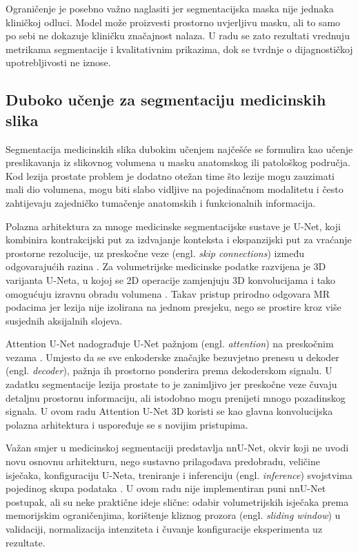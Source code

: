 \documentclass[a4paper,12pt,oneside]{article}
\begin{document}
Ograničenje je posebno važno naglasiti jer segmentacijska maska nije jednaka kliničkoj odluci. Model može proizvesti prostorno uvjerljivu masku, ali to samo po sebi ne dokazuje kliničku značajnost nalaza. U radu se zato rezultati vrednuju metrikama segmentacije i kvalitativnim prikazima, dok se tvrdnje o dijagnostičkoj upotrebljivosti ne iznose.

\subsection{Duboko učenje za segmentaciju medicinskih slika}

Segmentacija medicinskih slika dubokim učenjem najčešće se formulira kao učenje preslikavanja iz slikovnog volumena u masku anatomskog ili patološkog područja. Kod lezija prostate problem je dodatno otežan time što lezije mogu zauzimati mali dio volumena, mogu biti slabo vidljive na pojedinačnom modalitetu i često zahtijevaju zajedničko tumačenje anatomskih i funkcionalnih informacija.

Polazna arhitektura za mnoge medicinske segmentacijske sustave je U-Net, koji kombinira kontrakcijski put za izdvajanje konteksta i ekspanzijski put za vraćanje prostorne rezolucije, uz preskočne veze (engl. \textit{skip connections}) između odgovarajućih razina \cite{unet}. Za volumetrijske medicinske podatke razvijena je 3D varijanta U-Neta, u kojoj se 2D operacije zamjenjuju 3D konvolucijama i tako omogućuju izravnu obradu volumena \cite{unet3d}. Takav pristup prirodno odgovara MR podacima jer lezija nije izolirana na jednom presjeku, nego se prostire kroz više susjednih aksijalnih slojeva.

Attention U-Net nadograđuje U-Net pažnjom (engl. \textit{attention}) na preskočnim vezama \cite{attention_unet}. Umjesto da se sve enkoderske značajke bezuvjetno prenesu u dekoder (engl. \textit{decoder}), pažnja ih prostorno ponderira prema dekoderskom signalu. U zadatku segmentacije lezija prostate to je zanimljivo jer preskočne veze čuvaju detaljnu prostornu informaciju, ali istodobno mogu prenijeti mnogo pozadinskog signala. U ovom radu Attention U-Net 3D koristi se kao glavna konvolucijska polazna arhitektura i uspoređuje se s novijim pristupima.

Važan smjer u medicinskoj segmentaciji predstavlja nnU-Net, okvir koji ne uvodi novu osnovnu arhitekturu, nego sustavno prilagođava predobradu, veličine isječaka, konfiguraciju U-Neta, treniranje i inferenciju (engl. \textit{inference}) svojstvima pojedinog skupa podataka \cite{nnunet}. U ovom radu nije implementiran puni nnU-Net postupak, ali su neke praktične ideje slične: odabir volumetrijskih isječaka prema memorijskim ograničenjima, korištenje kliznog prozora (engl. \textit{sliding window}) u validaciji, normalizacija intenziteta i čuvanje konfiguracije eksperimenta uz rezultate.
\end{document}
